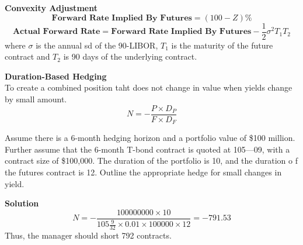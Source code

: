 \documentclass[11pt,fleqn]{report} %
\numberwithin{equation}{section} %
\numberwithin{figure}{section} %
\numberwithin{table}{section} %
\begin{document}
\begin{theorem}\textbf{Convexity Adjustment}\\
$$
\textbf{Forward Rate Implied By Futures}=(100-Z)\%
$$
$$
\textbf{Actual Forward Rate}=\textbf{Forward Rate Implied By Futures}-\frac{1}{2}\sigma^2T_1T_2
$$
where $\sigma$ is the annual sd of the 90-LIBOR, $T_1$ is the maturity of the future contract and $T_2$ is 90 days of the underlying contract.
\end{theorem}
\begin{theorem}\textbf{Duration-Based Hedging}\\
To create a combined position taht does not change in value when yields change by small amount.
$$
N=-\frac{P\times D_P}{F\times D_F}
$$
\end{theorem}
\begin{exercise}
Assume there is a 6-month hedging horizon and a portfolio value of \$100 million. Further
assume that the 6-month T-bond contract is quoted at 105—09, with a contract size of
\$100,000. The duration of the portfolio is 10, and the duration o f the futures contract is
12. Outline the appropriate hedge for small changes in yield.

\textbf{Solution}
$$
N=-\frac{100000000\times 10}{105\frac{9}{32}\times 0.01\times 100000\times 12}=-791.53
$$
Thus, the manager should short 792 contracts.
\end{exercise}

\end{document}
